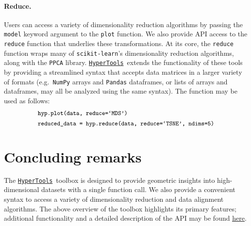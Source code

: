 \documentclass[twoside,11pt]{article}
\newcommand{\hypertools}{\href{https://github.com/ContextLab/hypertools}{\texttt{HyperTools}}}
\begin{document}
\paragraph{Reduce.} Users can access a variety of dimensionality reduction algorithms by passing the \texttt{model} keyword argument to the \texttt{plot} function.  We also provide API access to the \texttt{reduce} function that underlies these transformations.  At its core, the \texttt{reduce} function wraps many of \texttt{scikit-learn}'s dimensionality reduction algorithms, along with the \texttt{PPCA} library.  \hypertools~extends the functionality of these tools by providing a streamlined syntax that accepts data matrices in a larger variety of formats (e.g.\ \texttt{NumPy} arrays and \texttt{Pandas} dataframes, or lists of arrays and dataframes, may all be analyzed using the same syntax).  The function may be used as follows:
\begin{align}
& \texttt{\small hyp.plot(data, reduce=`MDS')} \\
& \texttt{\small reduced\_data = hyp.reduce(data, reduce=`TSNE', ndims=5)}
\end{align}




\section{Concluding remarks}
The \hypertools~toolbox is designed to provide geometric insights into high-dimensional datasets with a single function call.  We also provide a convenient syntax to access a variety of dimensionality reduction and data alignment algorithms.  The above overview of the toolbox highlights its primary features; additional functionality and a detailed description of the API may be found \href{http://hypertools.readthedocs.io/en/latest/}{\underline{here}}.
\end{document}
